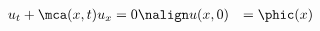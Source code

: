 \begin{defnbox}\nospacing
    \begin{defn}[Transport Equation\hfill\tcblack{$\flux=\mca u$}]\label{defn:transport_equation}
        \begin{align}
            u_t+\mca(x,t) u_x&=0 \nonumber\nalign
            u(x,0)&=\phic(x)\label{eq:transport_equation}
        \end{align}
    \end{defn}
\end{defnbox}

